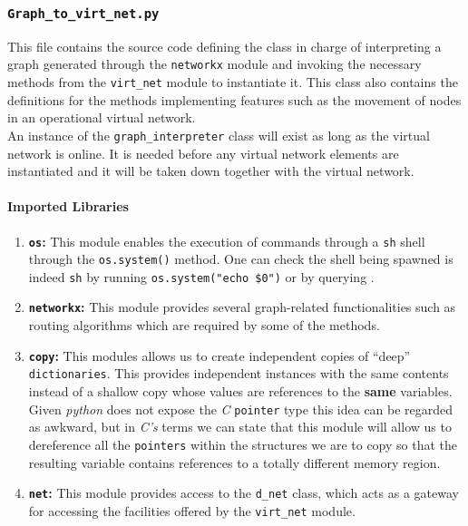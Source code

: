 \subsubsection{\texttt{Graph\_to\_virt\_net.py}}
   This file contains the source code defining the class in charge of interpreting a graph generated through the \texttt{networkx} module and invoking the necessary methods from the \texttt{virt\_net} module to instantiate it. This class also contains the definitions for the methods implementing features such as the movement of nodes in an operational virtual network.\\

   An instance of the \texttt{graph\_interpreter} class will exist as long as the virtual network is online. It is needed before any virtual network elements are instantiated and it will be taken down together with the virtual network.\\

   \paragraph{Imported Libraries}
        \begin{enumerate}
            \item \textbf{\texttt{os}:} This module enables the execution of commands through a \texttt{sh} shell through the \texttt{os.system()} method. One can check the shell being spawned is indeed \texttt{sh} by running \texttt{\allowbreak os.system("echo \$0")} or by querying \cite{bib:man-system}.
            \item \textbf{\texttt{networkx}:} This module provides several graph-related functionalities such as routing algorithms which are required by some of the methods.
            \item \textbf{\texttt{copy}:} This modules allows us to create independent copies of ``deep'' \texttt{dictionaries}. This provides independent instances with the same contents instead of a shallow copy whose values are references to the \textbf{same} variables. Given \textit{python} does not expose the \textit{C} \texttt{pointer} type this idea can be regarded as awkward, but in \textit{C's} terms we can state that this module will allow us to dereference all the \texttt{pointers} within the structures we are to copy so that the resulting variable contains references to a totally different memory region.
            \item \textbf{\texttt{net}:} This module provides access to the \texttt{d\_net} class, which acts as a gateway for accessing the facilities offered by the \texttt{virt\_net} module.
        \end{enumerate}

